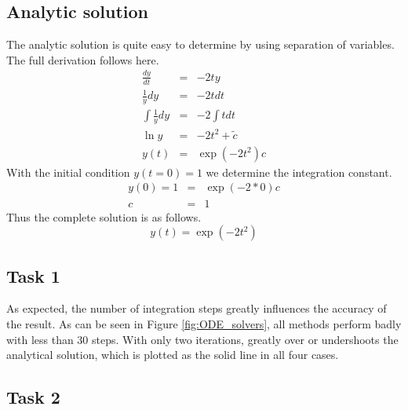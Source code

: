 \documentclass{aa}
\begin{document}
\subsection{Analytic solution}%
\label{sub:analytic_solution}

The analytic solution is quite easy to determine by using separation of variables. The full
derivation follows here.
\begin{eqnarray}
    \label{equ:analytic_solution}
    \frac{dy}{dt} & = & -2ty \\
    \frac{1}{y} dy & = & -2t dt \\
    \int \frac{1}{y} dy & = & -2 \int t dt \\ 
    \ln y & = & -2 t^2 + \tilde{c} \\
    y(t) & = & \exp\left(-2 t^2\right) c
\end{eqnarray}
With the initial condition \(y(t=0) = 1\) we determine the integration constant.
\begin{eqnarray}
    \label{equ:analytic_solution_2}
    y(0) = 1 & = & \exp\left(-2 * 0\right) c \\
    c & = & 1
\end{eqnarray}
Thus the complete solution is as follows.
\begin{equation}
    \label{eqn:analytic_solution_2}
    y(t) = \exp\left(-2 t^2\right)
\end{equation}

\subsection{Task 1}%
\label{sub:res_task_1}

As expected, the number of integration steps greatly influences the accuracy of the result. As
can be seen in Figure \ref{fig:ODE_solvers}, all methods perform badly with less than 30 steps.
With only two iterations, greatly over or undershoots the analytical solution, which is plotted
as the solid line in all four cases. 

\subsection{Task 2}%
\label{ssub:res_task_2}
\end{document}
